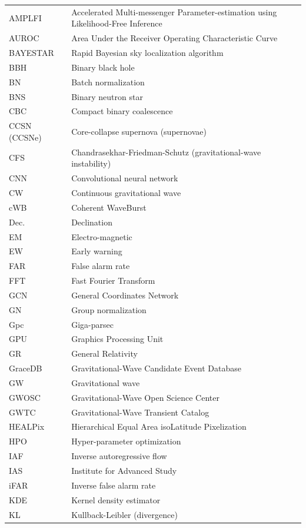 \begin{longtable}{p{} p{}}
AMPLFI & Accelerated Multi-messenger Parameter-estimation using Likelihood-Free Inference \\
AUROC & Area Under the Receiver Operating Characteristic Curve \\
BAYESTAR & Rapid Bayesian sky localization algorithm \\
BBH & Binary black hole \\
BN & Batch normalization \\
BNS & Binary neutron star \\
CBC & Compact binary coalescence \\
CCSN (CCSNe) & Core-collapse supernova (supernovae) \\
CFS & Chandrasekhar-Friedman-Schutz (gravitational-wave instability) \\
CNN & Convolutional neural network \\
CW & Continuous gravitational wave \\
cWB & Coherent WaveBurst \\
Dec. & Declination \\
EM & Electro-magnetic \\
EW & Early warning \\
FAR & False alarm rate \\
FFT & Fast Fourier Transform \\
GCN & General Coordinates Network \\
GN & Group normalization \\
Gpc & Giga-parsec \\
GPU & Graphics Processing Unit \\
GR & General Relativity \\
GraceDB & Gravitational-Wave Candidate Event Database \\
GW & Gravitational wave \\
GWOSC & Gravitational-Wave Open Science Center \\
GWTC & Gravitational-Wave Transient Catalog \\
HEALPix & Hierarchical Equal Area isoLatitude Pixelization \\
HPO & Hyper-parameter optimization \\
IAF & Inverse autoregressive flow \\
IAS & Institute for Advanced Study \\
iFAR & Inverse false alarm rate \\
KDE & Kernel density estimator \\
KL & Kullback-Leibler (divergence) \\

\end{longtable}
